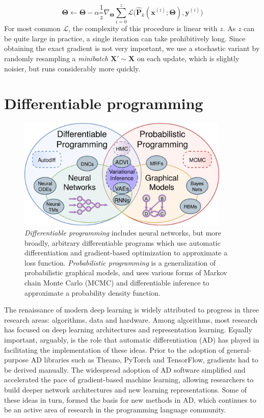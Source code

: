 \documentclass[12pt,initial,twoside,maitrise]{dms}
\numberwithin{equation}{section}
\numberwithin{table}{chapter}
\numberwithin{figure}{chapter}
\begin{document}
%
\begin{equation} \label{eq:stochastic_grad_descent}
    \mathbf\Theta \leftarrow \mathbf\Theta - \alpha\frac{1}{z}\nabla_{\mathbf\Theta} \sum_{i=0}^z\mathcal{L}\big(\mathbf{\hat P}_k(\mathbf{x}^{(i)}; \mathbf{\Theta}), \mathbf{y}^{(i)}\big)
\end{equation}
%
For most common $\mathcal{L}$, the complexity of this procedure is linear with $z$. As $z$ can be quite large in practice, a single iteration can take prohibitively long. Since obtaining the exact gradient is not very important, we use a stochastic variant by randomly resampling a \textit{minibatch} $\mathbf{X}' \sim \mathbf{X}$ on each update, which is slightly noisier, but runs considerably more quickly.

\section{Differentiable programming}\label{sec:differentiable-programming}

\begin{figure}
    \centering
    \includegraphics[width=0.90\textwidth]{diff_prob_prog.png}
    \caption{\textit{Differentiable programming} includes neural networks, but more broadly, arbitrary differentiable programs which use automatic differentiation and gradient-based optimization to approximate a loss function. \textit{Probabilistic programming} is a generalization of probabilistic graphical models, and uses various forms of Markov chain Monte Carlo (MCMC) and differentiable inference to approximate a probability density function.}
    \label{fig:diff_prob_prog}
\end{figure}

The renaissance of modern deep learning is widely attributed to progress in three research areas: algorithms, data and hardware. Among algorithms, most research has focused on deep learning architectures and representation learning. Equally important, arguably, is the role that automatic differentiation (AD) has played in facilitating the implementation of these ideas. Prior to the adoption of general-purpose AD libraries such as Theano, PyTorch and TensorFlow, gradients had to be derived manually. The widespread adoption of AD software simplified and accelerated the pace of gradient-based machine learning, allowing researchers to build deeper network architectures and new learning representations. Some of these ideas in turn, formed the basis for new methods in AD, which continues to be an active area of research in the programming language community.
\end{document}
